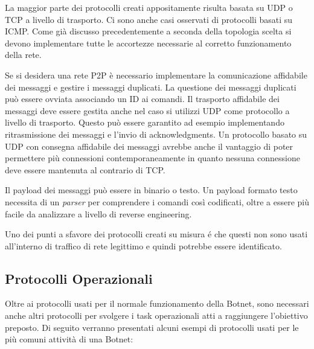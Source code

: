 La maggior parte dei protocolli creati appositamente risulta basata su UDP o TCP a livello di trasporto. Ci sono anche casi osservati di protocolli basati su ICMP. Come già discusso precedentemente a seconda della topologia scelta  si devono implementare tutte le accortezze necessarie al corretto funzionamento della rete. 

Se si desidera una rete P2P è necessario implementare la comunicazione affidabile dei messaggi e gestire i messaggi duplicati. La questione dei messaggi duplicati può essere ovviata associando un ID ai comandi.
Il trasporto affidabile dei messaggi deve essere gestita anche nel caso si utilizzi UDP come protocollo a livello di trasporto. Questo può essere garantito ad esempio implementando ritrasmissione dei messaggi e l'invio di acknowledgments.
Un protocollo basato su UDP con consegna affidabile dei messaggi avrebbe anche il vantaggio di poter permettere più connessioni contemporaneamente in quanto nessuna connessione deve essere mantenuta al contrario di TCP.

Il payload dei messaggi può essere in binario o testo. Un payload formato testo necessita di un \textit{parser} per comprendere i comandi così codificati, oltre a essere più facile da analizzare a livello di reverse engineering.

Uno dei punti a sfavore dei protocolli creati su misura é che questi non sono usati all'interno di traffico di rete legittimo e quindi potrebbe essere identificato.

\subsection{Protocolli Operazionali}
Oltre ai protocolli usati per il normale funzionamento della Botnet, sono necessari anche altri protocolli per svolgere i task operazionali atti a  raggiungere l'obiettivo preposto. 
Di seguito verranno presentati alcuni esempi di  protocolli usati per le più comuni attività  di una Botnet:

